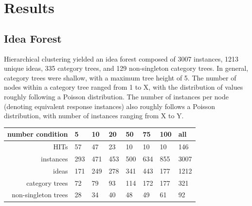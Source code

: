 \section{Results}

\subsection{Idea Forest}

Hierarchical clustering yielded an idea forest composed of 3007 instances, 1213 unique ideas, 335 category trees, and 129 non-singleton category trees. In general, category trees were shallow, with a maximum tree height of 5. The number of nodes within a category tree ranged from 1 to X, with the distribution of values roughly following a Poisson distribution. The number of instances per node (denoting equivalent response instances) also roughly follows a Poisson distribution, with number of instances ranging from X to Y.

\begin{table}
	\begin{tabular}[h!]{r | l l l l l l l}
	\textbf{number condition} & 5 & 10 & 20 & 50 & 75 & 100 & all \\ \hline \hline
	HITs & 57 & 47 & 23 & 10 & 10 & 10 & 146\\
	instances & 293 & 471 & 453 & 500 & 634 & 855 & 3007\\
	ideas & 171 & 249 & 278 & 341 & 443 & 177 &1212\\
	category trees & 72 & 79 & 93 & 114 & 172 & 177 &321\\
	non-singleton trees & 28 & 34 & 40 & 48 & 49 & 61 &92\\
	\end{tabular}
\end{table}



